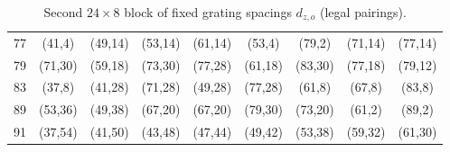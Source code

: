 \documentclass[11pt,a4paper]{article}
\begin{document}
\begin{table}[htbp]
\begin{tabular}{c|cccccccc}
77 & (41,4) & (49,14) & (53,14) & (61,14) & (53,4) & (79,2) & (71,14) & (77,14) \\
79 & (71,30) & (59,18) & (73,30) & (77,28) & (61,18) & (83,30) & (77,18) & (79,12) \\
83 & (37,8) & (41,28) & (71,28) & (49,28) & (77,28) & (61,8) & (67,8) & (83,8) \\
89 & (53,36) & (49,38) & (67,20) & (67,20) & (79,30) & (73,20) & (61,2) & (89,2) \\
91 & (37,54) & (41,50) & (43,48) & (47,44) & (49,42) & (53,38) & (59,32) & (61,30) \\
\end{tabular}
\caption{Second \(24 \times 8\) block of fixed grating spacings \(d_{z,o}\) (legal pairings).}
\label{tab:d-block2}
\end{table}
\end{document}

